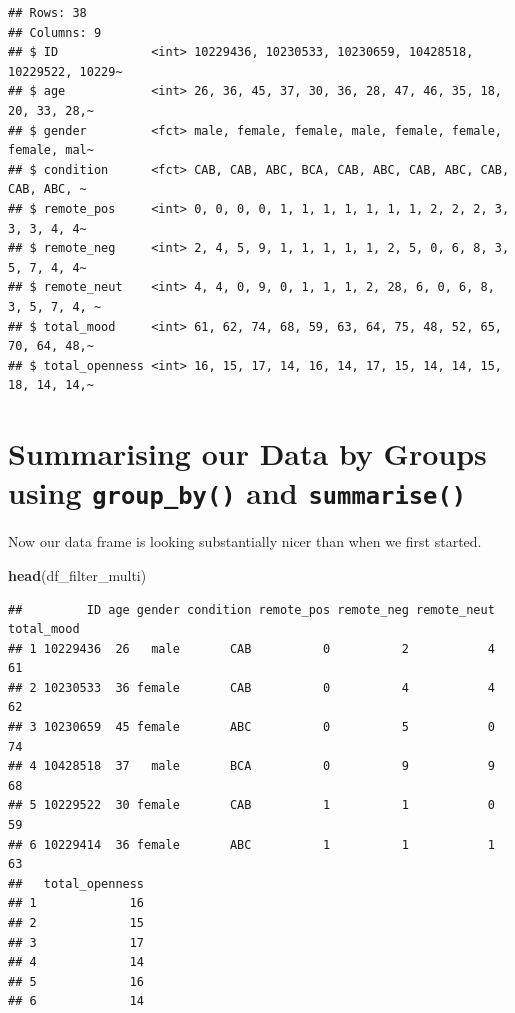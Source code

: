 \documentclass[
]{book}
\newenvironment{Shaded}{\begin{snugshade}}{\end{snugshade}}
\newcommand{\FunctionTok}[1]{\textcolor[rgb]{0.13,0.29,0.53}{\textbf{#1}}}
\newcommand{\NormalTok}[1]{#1}
\begin{document}
\begin{verbatim}
## Rows: 38
## Columns: 9
## $ ID             <int> 10229436, 10230533, 10230659, 10428518, 10229522, 10229~
## $ age            <int> 26, 36, 45, 37, 30, 36, 28, 47, 46, 35, 18, 20, 33, 28,~
## $ gender         <fct> male, female, female, male, female, female, female, mal~
## $ condition      <fct> CAB, CAB, ABC, BCA, CAB, ABC, CAB, ABC, CAB, CAB, ABC, ~
## $ remote_pos     <int> 0, 0, 0, 0, 1, 1, 1, 1, 1, 1, 1, 2, 2, 2, 3, 3, 3, 4, 4~
## $ remote_neg     <int> 2, 4, 5, 9, 1, 1, 1, 1, 1, 2, 5, 0, 6, 8, 3, 5, 7, 4, 4~
## $ remote_neut    <int> 4, 4, 0, 9, 0, 1, 1, 1, 2, 28, 6, 0, 6, 8, 3, 5, 7, 4, ~
## $ total_mood     <int> 61, 62, 74, 68, 59, 63, 64, 75, 48, 52, 65, 70, 64, 48,~
## $ total_openness <int> 16, 15, 17, 14, 16, 14, 17, 15, 14, 14, 15, 18, 14, 14,~
\end{verbatim}

\section{\texorpdfstring{Summarising our Data by Groups using \texttt{group\_by()} and \texttt{summarise()}}{Summarising our Data by Groups using group\_by() and summarise()}}\label{summarising-our-data-by-groups-using-group_by-and-summarise}

Now our data frame is looking substantially nicer than when we first started.

\begin{Shaded}
\begin{Highlighting}[]
\FunctionTok{head}\NormalTok{(df\_filter\_multi)}
\end{Highlighting}
\end{Shaded}

\begin{verbatim}
##         ID age gender condition remote_pos remote_neg remote_neut total_mood
## 1 10229436  26   male       CAB          0          2           4         61
## 2 10230533  36 female       CAB          0          4           4         62
## 3 10230659  45 female       ABC          0          5           0         74
## 4 10428518  37   male       BCA          0          9           9         68
## 5 10229522  30 female       CAB          1          1           0         59
## 6 10229414  36 female       ABC          1          1           1         63
##   total_openness
## 1             16
## 2             15
## 3             17
## 4             14
## 5             16
## 6             14
\end{verbatim}
\end{document}
